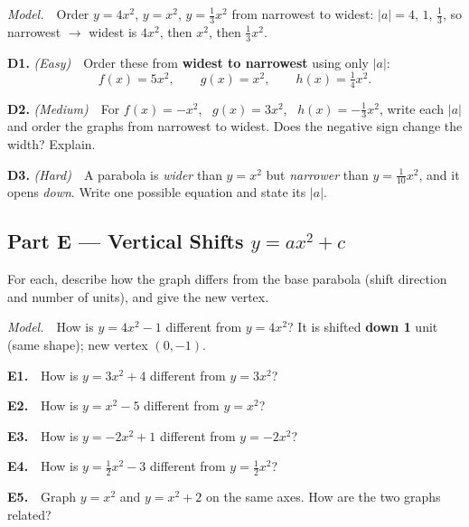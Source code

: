 \documentclass[11pt]{article}
\begin{document}
\textit{Model.}\ \ Order $y=4x^2$, $y=x^2$, $y=\tfrac13 x^2$ from narrowest to widest:
$|a|=4,\,1,\,\tfrac13$, so narrowest $\to$ widest is $4x^2$, then $x^2$, then $\tfrac13 x^2$.

\vspace{6pt}
\textbf{D1.} \emph{(Easy)}\ \ Order these from \textbf{widest to narrowest} using only $|a|$:
\[
f(x) = 5x^2, \qquad g(x) = x^2, \qquad h(x) = \tfrac{1}{4}x^2.
\]
\vspace{1.4cm}

\textbf{D2.} \emph{(Medium)}\ \ For $f(x) = -x^2$, \ $g(x) = 3x^2$, \ $h(x) = -\tfrac{1}{3}x^2$,
write each $|a|$ and order the graphs from narrowest to widest. Does the negative sign change
the width? Explain.
\vspace{1.8cm}

\textbf{D3.} \emph{(Hard)}\ \ A parabola is \emph{wider} than $y = x^2$ but \emph{narrower} than
$y = \tfrac{1}{10}x^2$, and it opens \emph{down}. Write one possible equation and state its $|a|$.
\vspace{2cm}

\subsection*{Part E --- Vertical Shifts $y = ax^2 + c$}

For each, describe how the graph differs from the base parabola (shift direction and number
of units), and give the new vertex.

\textit{Model.}\ \ How is $y = 4x^2 - 1$ different from $y = 4x^2$? It is shifted \textbf{down 1}
unit (same shape); new vertex $(0,-1)$.

\vspace{6pt}
\textbf{E1.}\ \ How is $y = 3x^2 + 4$ different from $y = 3x^2$?
\vspace{1.3cm}

\textbf{E2.}\ \ How is $y = x^2 - 5$ different from $y = x^2$?
\vspace{1.3cm}

\textbf{E3.}\ \ How is $y = -2x^2 + 1$ different from $y = -2x^2$?
\vspace{1.3cm}

\textbf{E4.}\ \ How is $y = \tfrac{1}{2}x^2 - 3$ different from $y = \tfrac{1}{2}x^2$?
\vspace{1.3cm}

\textbf{E5.}\ \ Graph $y = x^2$ and $y = x^2 + 2$ on the same axes. How are the two graphs related?
\vspace{1.6cm}
\end{document}
